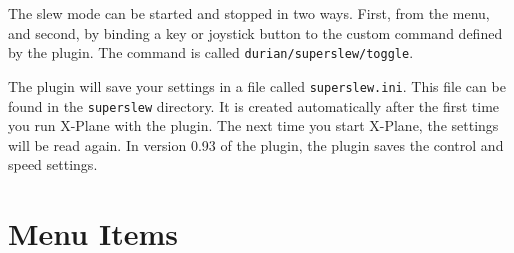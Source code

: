 \documentclass[a4paper,12pt]{article}
\begin{document}
The slew mode can be started and stopped in two ways. First, from the
menu, and second, by binding a key or joystick button to the custom command
defined by the plugin. The command is called
\texttt{durian/superslew/toggle}. 

The plugin will save your settings in a file called \texttt{superslew.ini}. This
file can be found in the \texttt{superslew} directory. It is created
automatically after the first time you run X-Plane with the plugin. The next
time you start X-Plane, the settings will be read again. In version 0.93 of the
plugin, the plugin saves the control and speed settings.

\clearpage
\section*{Menu Items}
\end{document}
